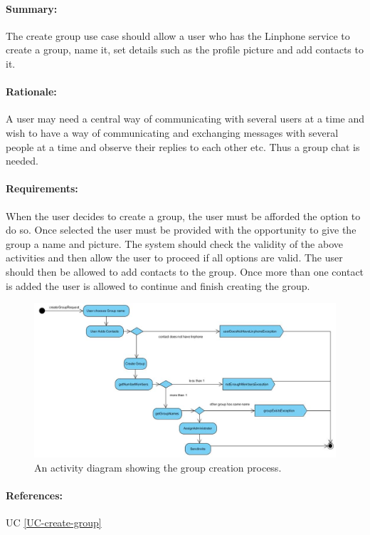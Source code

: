 \documentclass[11pt]{article}
\begin{document}
\paragraph{Summary:} The create group use case should allow a user who has the Linphone service to create a group, name it, set details such as the profile picture and add contacts to it.
\paragraph{Rationale:} A user may need a central way of communicating with several users at a time and wish to have a way of communicating and exchanging messages with several people at a time and observe their replies to each other etc. Thus a group chat is needed.
\paragraph{Requirements:} When the user decides to create a group, the user must be afforded the option to do so. Once selected the user must be provided with the opportunity to give the group a name and picture. The system should check the validity of the above activities and then allow the user to proceed if all options are valid. The user should then be allowed to add contacts to the group. Once more than one contact is added the user is allowed to continue and finish creating the group.
\begin{figure}[H]
\centering
\includegraphics[width=5in]{./images/process-create.jpg}
\caption[Create Group Activity Diagram]{An activity diagram showing the group creation process.}
\label{FR-figure-create-group}
\end{figure}
\paragraph{References:} UC \ref{UC-create-group}
\end{document}
